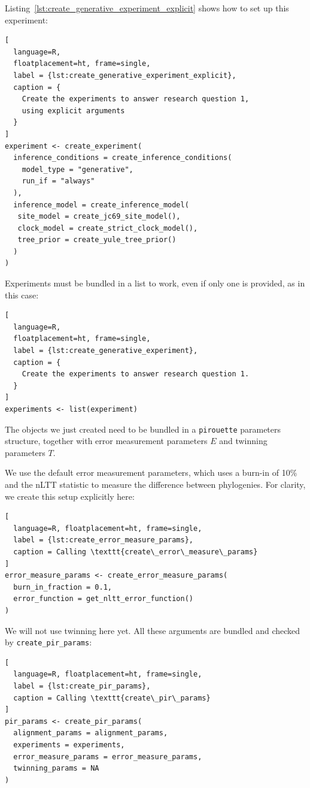 \documentclass{article}
\begin{document}
Listing~\ref{lst:create_generative_experiment_explicit} shows how to
set up this experiment:

\begin{lstlisting}[
  language=R, 
  floatplacement=ht, frame=single,
  label = {lst:create_generative_experiment_explicit},
  caption = {
    Create the experiments to answer research question 1, 
    using explicit arguments
  }
]
experiment <- create_experiment(
  inference_conditions = create_inference_conditions(
    model_type = "generative", 
    run_if = "always"
  ), 
  inference_model = create_inference_model(
   site_model = create_jc69_site_model(), 
   clock_model = create_strict_clock_model(), 
   tree_prior = create_yule_tree_prior()
  )
)
\end{lstlisting}

Experiments must be bundled in a list to work, even if only one is provided, as 
in this case:

\begin{lstlisting}[
  language=R, 
  floatplacement=ht, frame=single,
  label = {lst:create_generative_experiment},
  caption = {
    Create the experiments to answer research question 1.
  }
]
experiments <- list(experiment)
\end{lstlisting}

The objects we just created need to be bundled
in a \verb;pirouette; parameters structure,
together with error measurement parameters $\mathit{E}$ and
twinning parameters $\mathit{T}$. 

We use the default error measurement
parameters, which uses a burn-in of 10\% and the nLTT statistic to
measure the difference between phylogenies. For clarity,
we create this setup explicitly here:

\begin{lstlisting}[
  language=R, floatplacement=ht, frame=single,
  label = {lst:create_error_measure_params},
  caption = Calling \texttt{create\_error\_measure\_params}
]
error_measure_params <- create_error_measure_params(
  burn_in_fraction = 0.1, 
  error_function = get_nltt_error_function()
)
\end{lstlisting}

We will not use twinning
here yet.  
All these arguments are bundled
and checked by \verb;create_pir_params;:

\begin{lstlisting}[
  language=R, floatplacement=ht, frame=single,
  label = {lst:create_pir_params},
  caption = Calling \texttt{create\_pir\_params}
]
pir_params <- create_pir_params(
  alignment_params = alignment_params,
  experiments = experiments,
  error_measure_params = error_measure_params,
  twinning_params = NA
)
\end{lstlisting}
\end{document}
